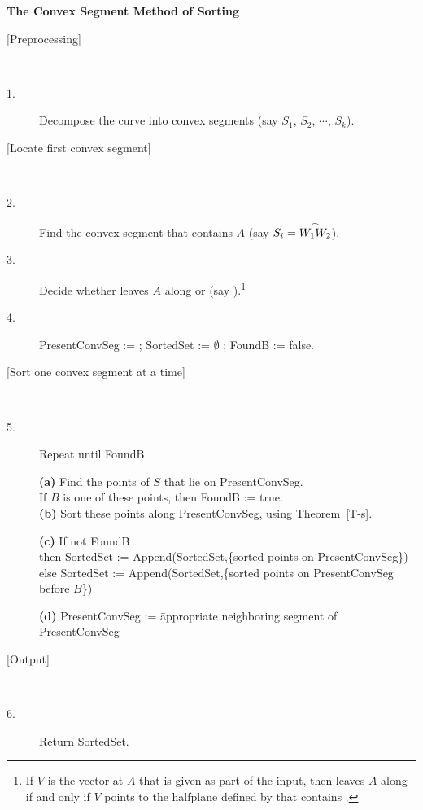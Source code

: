 \begin{center}{\bf The Convex Segment Method of Sorting}\end{center}
\begin{description}
\item[{[Preprocessing]}] \ \ \ 
\item[\hspace{.1in} 1.] Decompose the curve into convex segments
	(say $S_{1}$, $S_{2}$, $\cdots$, $S_{k}$).
%
\item[{[Locate first convex segment]}] \ \ \ 
\item[\hspace{.1in} 2.]
  Find the convex segment that contains $A$ (say $S_{i} = \mbox{$\stackrel{\frown}{\mbox{$W_{1}$}\mbox{$W_{2}$}}$}$).
\item[\hspace{.1in} 3.]
  Decide whether  leaves $A$ along  or \arc{AW_{2}}
  (say \arc{AW_{1}}).\footnote{If $V$ is the vector at $A$ that is given as 
   part of the input, then \arc{AB} leaves $A$ along \arc{AW_{1}} if 
\label{alg-page}
	and only if $V$ points to the halfplane defined by \lyne{AW_{1}} 
	that contains .}
\item[\hspace{.1in} 4.]
	PresentConvSeg :=  ;
	SortedSet := $\emptyset$ ;
	FoundB := false.
%
\item[{[Sort one convex segment at a time]}] \ \ \ 
\item[\hspace{.1in} 5.]
	Repeat until FoundB
\item[]
\begin{tabbing}
\hspace{-.3in} {\bf (a)} \= Find the points of $S$ that lie on 
PresentConvSeg.\\
	\> If $B$ is one of these points, then FoundB := true.\\
\hspace{-.3in} {\bf (b)} \> Sort these points along PresentConvSeg, 
	using Theorem~\ref{T-s}.
\end{tabbing}
\pagebreak
\begin{tabbing}
\hspace{-.3in} {\bf (c)} \= If not FoundB\\
	\> then \= SortedSet := Append(SortedSet,\{sorted points 
	on PresentConvSeg\})\\
	\> else \> SortedSet := Append(SortedSet,\{sorted points on 
PresentConvSeg before $B$\})
\end{tabbing}
\begin{tabbing}
\hspace{-.3in} {\bf (d)} PresentConvSeg := \= appropriate neighboring 
segment of PresentConvSeg
\end{tabbing}


\item[{[Output]}] \ \ \ 
\item[\hspace{.1in} 6.]
	Return SortedSet.
\end{description}

